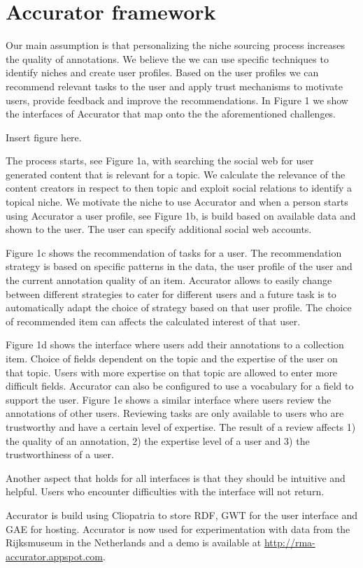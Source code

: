 \section{Accurator framework}
\label{architecture}
Our main assumption is that personalizing the niche sourcing process increases the quality of annotations. We believe the we can use specific techniques to identify niches and create user profiles. Based on the user profiles we can recommend relevant tasks to the user and apply trust mechanisms to motivate users, provide feedback and improve the recommendations. In Figure 1 we show the interfaces of Accurator that map onto the the aforementioned challenges. 

Insert figure here.

The process starts, see Figure 1a, with searching the social web for user generated content that is relevant for a topic. We calculate the relevance of the content creators in respect to then topic and exploit social relations to identify a topical niche. We motivate the niche to use Accurator and when a person starts using Accurator a user profile, see Figure 1b, is build based on available data and shown to the user. The user can specify additional social web accounts.

Figure 1c shows the recommendation of tasks for a user. The recommendation strategy is based on specific patterns in the data, the user profile of the user and the current annotation quality of an item. Accurator allows to easily change between different strategies to cater for different users and a future task is to automatically adapt the choice of strategy based on that user profile. The choice of recommended item can affects the calculated interest of that user.

Figure 1d shows the interface where users add their annotations to a collection item. Choice of fields dependent on the topic and the expertise of the user on that topic. Users with more expertise on that topic are allowed to enter more difficult fields. Accurator can also be configured to use a vocabulary for a field to support the user. Figure 1e shows a similar interface where users review the annotations of other users. Reviewing tasks are only available to users who are trustworthy and have a certain level of expertise. The result of a review affects 1) the quality of an annotation, 2) the expertise level of a user and 3) the trustworthiness of a user.

Another aspect that holds for all interfaces is that they should be intuitive and helpful. Users who encounter difficulties with the interface will not return. 

Accurator is build using Cliopatria to store RDF, GWT for the user interface and GAE for hosting. Accurator is now used for experimentation with data from the Rijksmuseum in the Netherlands and a demo is available at \url{http://rma-accurator.appspot.com}.



